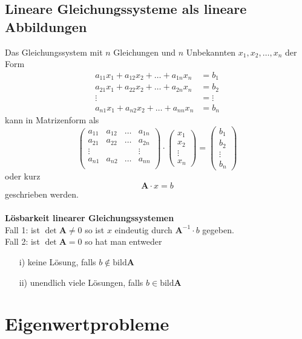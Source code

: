 \subsection{Lineare Gleichungssysteme als lineare Abbildungen}
Das Gleichungssystem mit $n$ Gleichungen und $n$ Unbekannten $x_1,x_2,\ldots,x_n$ der Form
\[\begin{aligned}
	a_{11}x_1 + a_{12}x_2 + \ldots + a_{1n}x_n &= b_1 \\
	a_{21}x_1 + a_{22}x_2 + \ldots + a_{2n}x_n &= b_2 \\
	\vdots &= \vdots\\
	a_{n1}x_1 + a_{n2}x_2 + \ldots + a_{nn}x_n &= b_n
\end{aligned}\]
kann in Matrizenform als
\[ \begin{pmatrix}
		a_{11} & a_{12} & \ldots & a_{1n} \\
		a_{21} & a_{22} & \ldots & a_{2n} \\
		\vdots &				&				 & \vdots \\
		a_{n1} & a_{n2} & \ldots & a_{nn} \\
	\end{pmatrix} \cdot \begin{pmatrix}
		x_1 \\ x_2 \\ \vdots \\ x_n
	\end{pmatrix} = \begin{pmatrix}
		b_1 \\ b_2 \\ \vdots \\ b_n
	\end{pmatrix}\]
oder kurz
\[ \textbf{A} \cdot x = b \]
geschrieben werden.\\
\\
\textbf{Lösbarkeit linearer Gleichungssystemen\\}
Fall 1: ist $\det\textbf{A}\neq 0$ so ist $x$ eindeutig durch $\textbf{A}^{-1}\cdot b$
gegeben.\\
Fall 2: ist $\det\textbf{A}= 0$ so hat man entweder
\begin{itemize}
	\item[i)] keine Lösung, falls $b \notin\text{bild}\textbf{A}$
	\item[ii)] unendlich viele Lösungen, falls $b \in\text{bild}\textbf{A}$
\end{itemize}

\section{Eigenwertprobleme}
